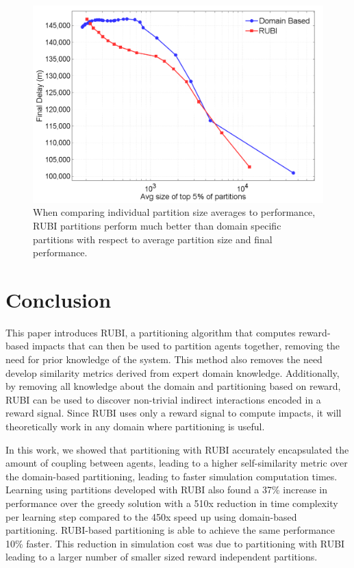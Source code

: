 \documentclass[letterpaper]{article}
\begin{document}
\begin{figure}
\centering
\includegraphics[width=1.0\columnwidth]{ATFMPPerformancevsAvgSize}
\caption{When comparing individual partition size averages to performance, RUBI partitions perform much better than domain specific partitions with respect to average partition size and final performance.}
\label{ATFMPPerformancevsAvgSize}
\end{figure}


\section{Conclusion}
This paper introduces RUBI, a partitioning algorithm that computes reward-based impacts that can then be used to partition agents together, removing the need for prior knowledge of the system. This method also removes the need develop similarity metrics derived from expert domain knowledge. Additionally, by removing all knowledge about the domain and partitioning based on reward, RUBI can be used to discover non-trivial indirect interactions encoded in a reward signal. Since RUBI uses only a reward signal to compute impacts, it will theoretically work in any domain where partitioning is useful.

In this work, we showed that partitioning with RUBI accurately encapsulated the amount of coupling between agents, leading to a higher self-similarity metric over the domain-based partitioning, leading to faster simulation computation times. Learning using partitions developed with RUBI also found a 37\% increase in performance over the greedy solution with a 510x reduction in time complexity per learning step  compared to the 450x speed up using domain-based partitioning. RUBI-based partitioning is able to achieve the same performance 10\% faster. This reduction in simulation cost was due to partitioning with RUBI leading to a larger number of smaller sized reward independent partitions.
\end{document}
